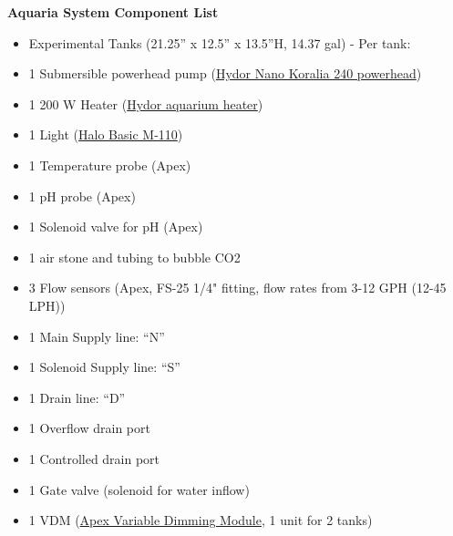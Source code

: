 \documentclass[]{book}
\providecommand{\tightlist}{%
  \setlength{\itemsep}{0pt}\setlength{\parskip}{0pt}}
\begin{document}
 \textbf{Aquaria System Component List}

\begin{itemize}
\tightlist
\item
  Experimental Tanks (21.25'' x 12.5'' x 13.5''H, 14.37 gal) - Per
  tank:\\
\item
  1 Submersible powerhead pump
  (\href{https://github.com/SilbigerLab/Mesocosm_User_Manual/blob/master/Manuals/Hydor_Nano_Pump.pdf}{Hydor
  Nano Koralia 240 powerhead})\\
\item
  1 200 W Heater
  (\href{https://github.com/SilbigerLab/Mesocosm_User_Manual/blob/master/Manuals/Hydor_Heater.pdf}{Hydor
  aquarium heater})\\
\item
  1 Light
  (\href{https://github.com/SilbigerLab/Mesocosm_User_Manual/blob/master/Manuals/Apex_Halo.pdf}{Halo
  Basic M-110})\\
\item
  1 Temperature probe (Apex)\\
\item
  1 pH probe (Apex)\\
\item
  1 Solenoid valve for pH (Apex)\\
\item
  1 air stone and tubing to bubble CO2\\
\item
  3 Flow sensors (Apex, FS-25 1/4" fitting, flow rates from 3-12 GPH
  (12-45 LPH))\\
\item
  1 Main Supply line: ``N''\\
\item
  1 Solenoid Supply line: ``S''\\
\item
  1 Drain line: ``D''\\
\item
  1 Overflow drain port\\
\item
  1 Controlled drain port\\
\item
  1 Gate valve (solenoid for water inflow)\\
\item
  1 VDM
  (\href{https://github.com/SilbigerLab/Mesocosm_User_Manual/blob/master/Manuals/VDM_manual.pdf}{Apex
  Variable Dimming Module}, 1 unit for 2 tanks)\\

\end{itemize}
\end{document}
